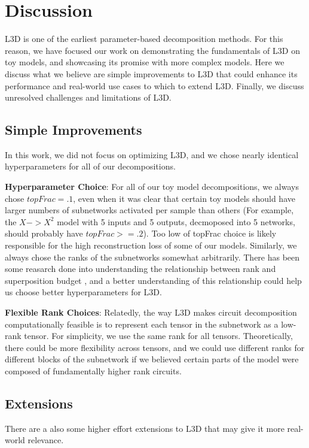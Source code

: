 \documentclass{article}
\theoremstyle{plain}
\theoremstyle{definition}
\theoremstyle{remark}
\begin{document}
\section{Discussion}

L3D is one of the earliest parameter-based decomposition methods. For this reason, we have focused our work on demonstrating the fundamentals of L3D on toy models, and showcasing its promise with more complex models. Here we discuss what we believe are simple improvements to L3D that could enhance its performance and real-world use cases to which to extend L3D. Finally, we discuss unresolved challenges and limitations of L3D. 

\subsection{Simple Improvements}
In this work, we did not focus on optimizing L3D, and we chose nearly identical hyperparameters for all of our decompositions. 

\textbf{Hyperparameter Choice}: For all of our toy model decompositions, we always chose $topFrac=.1$, even when it was clear that certain toy models should have larger numbers of subnetworks activated per sample than others (For example, the $X->X^2$ model with 5 inputs and 5 outputs, decmoposed into 5 networks, should probably have $topFrac>=.2$). Too low of topFrac choice is likely responsible for the high reconstruction loss of some of our models. Similarly, we always chose the ranks of the subnetworks somewhat arbitrarily. There has been some reasarch done into understanding the relationship between rank and superposition budget \cite{}, and a better understanding of this relationship could help us choose better hyperparameters for L3D. 

\textbf{Flexible Rank Choices}: Relatedly, the way L3D makes circuit decomposition computationally feasible is to represent each tensor in the subnetwork as a low-rank tensor. For simplicity, we use the same rank for all tensors. Theoretically, there could be more flexibility across tensors, and we could use different ranks for different blocks of the subnetwork if we believed certain parts of the model were composed of fundamentally higher rank circuits. 

\subsection{Extensions}

There are a also some higher effort extensions to L3D that may give it more real-world relevance. 
\end{document}
